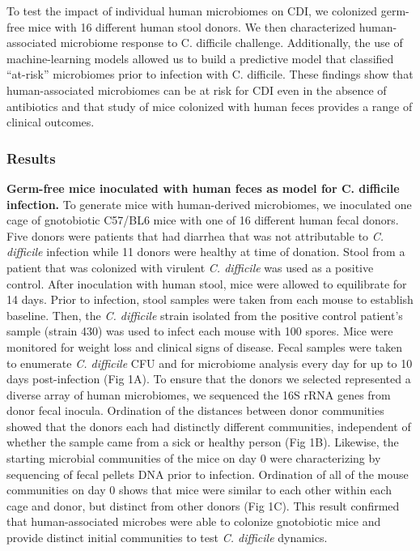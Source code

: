 \documentclass[11pt,]{article}
\begin{document}
To test the impact of individual human microbiomes on CDI, we colonized
germ-free mice with 16 different human stool donors. We then
characterized human-associated microbiome response to C. difficile
challenge. Additionally, the use of machine-learning models allowed us
to build a predictive model that classified ``at-risk'' microbiomes
prior to infection with C. difficile. These findings show that
human-associated microbiomes can be at risk for CDI even in the absence
of antibiotics and that study of mice colonized with human feces
provides a range of clinical outcomes.

\subsubsection{Results}\label{results}

\textbf{Germ-free mice inoculated with human feces as model for C.
difficile infection.} To generate mice with human-derived microbiomes,
we inoculated one cage of gnotobiotic C57/BL6 mice with one of 16
different human fecal donors. Five donors were patients that had
diarrhea that was not attributable to \emph{C. difficile} infection
while 11 donors were healthy at time of donation. Stool from a patient
that was colonized with virulent \emph{C. difficile} was used as a
positive control. After inoculation with human stool, mice were allowed
to equilibrate for 14 days. Prior to infection, stool samples were taken
from each mouse to establish baseline. Then, the \emph{C. difficile}
strain isolated from the positive control patient's sample (strain 430)
was used to infect each mouse with 100 spores. Mice were monitored for
weight loss and clinical signs of disease. Fecal samples were taken to
enumerate \emph{C. difficile} CFU and for microbiome analysis every day
for up to 10 days post-infection (Fig 1A). To ensure that the donors we
selected represented a diverse array of human microbiomes, we sequenced
the 16S rRNA genes from donor fecal inocula. Ordination of the distances
between donor communities showed that the donors each had distinctly
different communities, independent of whether the sample came from a
sick or healthy person (Fig 1B). Likewise, the starting microbial
communities of the mice on day 0 were characterizing by sequencing of
fecal pellets DNA prior to infection. Ordination of all of the mouse
communities on day 0 shows that mice were similar to each other within
each cage and donor, but distinct from other donors (Fig 1C). This
result confirmed that human-associated microbes were able to colonize
gnotobiotic mice and provide distinct initial communities to test
\emph{C. difficile} dynamics.
\end{document}
